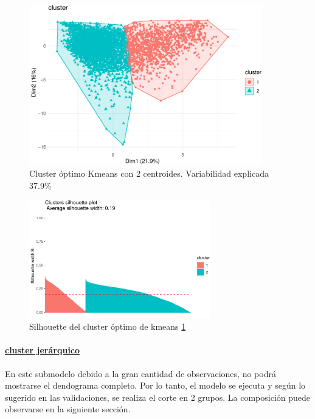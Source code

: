 \begin{figure}[!htb]
	\centering
	\includegraphics[width=0.9\textwidth]{imagenes/modelo_clusters/unnamed-chunk-18-1.pdf}
	\caption{Cluster óptimo Kmeans con 2 centroides. Variabilidad explicada 37.9\%}
	\label{fig:kmeans_cluster_optimo}
\end{figure}

\begin{figure}[!htb]
	\centering
	\includegraphics[width=0.7\textwidth]{imagenes/modelo_clusters/unnamed-chunk-18-2.pdf}
	\caption{Silhouette del cluster óptimo de kmeans \ref{fig:kmeans_cluster_optimo}}
	\label{fig:kmeans_cluster_optimo_silhouette}
\end{figure}


\clearpage


\hypertarget{cluster-jeruxe1rquico}{%
	\paragraph{\textbf{\underline{cluster jerárquico}}}\label{cluster-jeruxe1rquico}}
En este submodelo debido a la gran cantidad de observaciones, no podrá mostrarse el dendograma completo. Por lo tanto, el modelo se ejecuta y según lo sugerido en
las validaciones, se realiza el corte en 2 grupos. La composición puede observarse en la siguiente sección.


